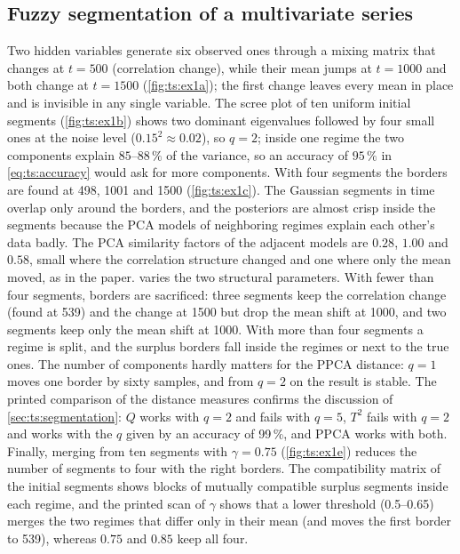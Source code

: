 \subsection{Fuzzy segmentation of a multivariate series}

Two hidden variables generate six observed ones through a mixing matrix that changes at $t=500$ (correlation change), while their mean jumps at $t=1000$ and both change at $t=1500$ (\cref{fig:ts:ex1a}); the first change leaves every mean in place and is invisible in any single variable. The scree plot of ten uniform initial segments (\cref{fig:ts:ex1b}) shows two dominant eigenvalues followed by four small ones at the noise level ($0.15^2\approx0.02$), so $q=2$; inside one regime the two components explain $85$--$88\,\%$ of the variance, so an accuracy of $95\,\%$ in \eqref{eq:ts:accuracy} would ask for more components. With four segments the borders are found at 498, 1001 and 1500 (\cref{fig:ts:ex1c}). The Gaussian segments in time overlap only around the borders, and the posteriors are almost crisp inside the segments because the PCA models of neighboring regimes explain each other's data badly. The PCA similarity factors of the adjacent models are $0.28$, $1.00$ and $0.58$, small where the correlation structure changed and one where only the mean moved, as in the paper.  varies the two structural parameters. With fewer than four segments, borders are sacrificed: three segments keep the correlation change (found at 539) and the change at 1500 but drop the mean shift at 1000, and two segments keep only the mean shift at 1000. With more than four segments a regime is split, and the surplus borders fall inside the regimes or next to the true ones. The number of components hardly matters for the PPCA distance: $q=1$ moves one border by sixty samples, and from $q=2$ on the result is stable. The printed comparison of the distance measures confirms the discussion of \cref{sec:ts:segmentation}: $Q$ works with $q=2$ and fails with $q=5$, $T^2$ fails with $q=2$ and works with the $q$ given by an accuracy of 99\,\%, and PPCA works with both. Finally, merging from ten segments with $\gamma=0.75$ (\cref{fig:ts:ex1e}) reduces the number of segments to four with the right borders. The compatibility matrix of the initial segments shows blocks of mutually compatible surplus segments inside each regime, and the printed scan of $\gamma$ shows that a lower threshold (0.5--0.65) merges the two regimes that differ only in their mean (and moves the first border to 539), whereas $0.75$ and $0.85$ keep all four.

